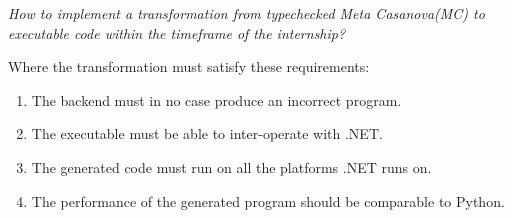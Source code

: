 \textit{How to implement a transformation from typechecked Meta Casanova(MC) to executable code within the timeframe of the internship?}

Where the transformation must satisfy these requirements:
\begin{enumerate}
    \item The backend must in no case produce an incorrect program.
    \item The executable must be able to inter-operate with .NET.
    \item The generated code must run on all the platforms .NET runs on.
    \item The performance of the generated program should be comparable to Python.
\end{enumerate}
